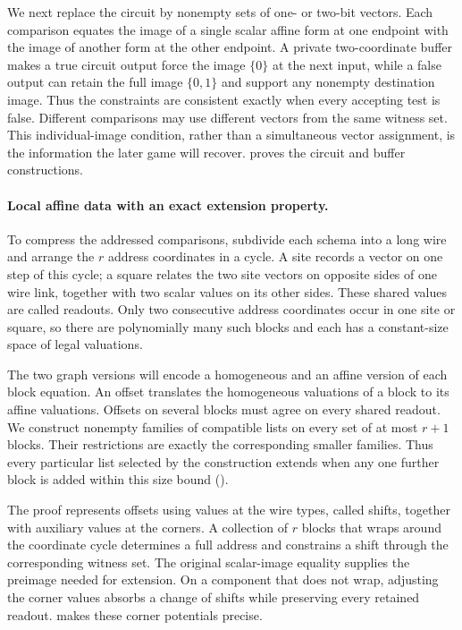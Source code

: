 \documentclass[11pt]{article}
\theoremstyle{definition}
\begin{document}
We next replace the circuit by nonempty sets of one- or two-bit vectors.
Each comparison equates the image of a single scalar affine form at
one endpoint with the image of another form at the other endpoint.
A private two-coordinate buffer makes a true circuit output force the
image \(\{0\}\) at the next input, while a false output can retain the
full image \(\{0,1\}\) and support any nonempty destination image.
Thus the constraints are consistent exactly when every accepting test
is false. Different comparisons may use different vectors from the
same witness set. This individual-image condition, rather than a
simultaneous vector assignment, is the information the later game
will recover.  proves the circuit and buffer
constructions.

\paragraph{Local affine data with an exact extension property.}
To compress the addressed comparisons, subdivide each schema into a
long wire and arrange the \(r\) address coordinates in a cycle.
A site records a vector on one step of this cycle; a square relates
the two site vectors on opposite sides of one wire link, together
with two scalar values on its other sides. These shared values are
called readouts. Only two consecutive address coordinates occur in
one site or square, so there are polynomially many such blocks and
each has a constant-size space of legal valuations.

The two graph versions will encode a homogeneous and an affine version
of each block equation. An offset translates the homogeneous valuations
of a block to its affine valuations. Offsets on several blocks must
agree on every shared readout. We construct nonempty families of compatible lists on every set of at
most \(r+1\) blocks. Their restrictions are exactly the corresponding
smaller families. Thus every particular list selected by the construction
extends when any one further block is added within this size bound
().

The proof represents offsets using values at the wire types, called
shifts, together with auxiliary values at the corners. A collection of
\(r\) blocks that wraps around the coordinate cycle determines a full
address and constrains a shift through the corresponding witness set.
The original scalar-image equality supplies the preimage needed for
extension. On a component that does not wrap, adjusting the corner
values absorbs a change of shifts while preserving every retained
readout.  makes these corner potentials precise.
\end{document}
